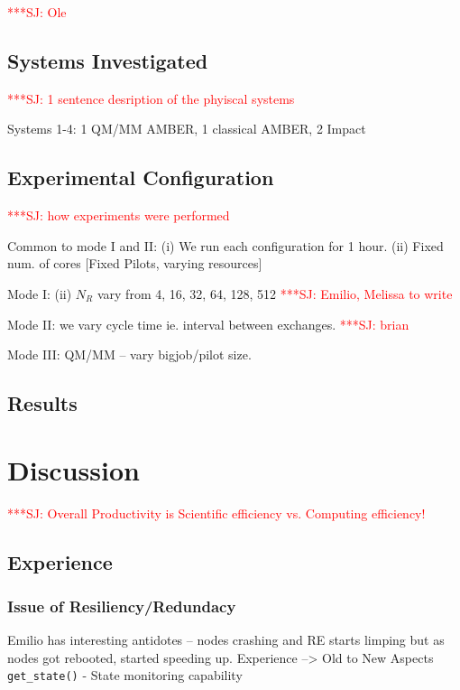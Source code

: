 \documentclass{sig-alternate}
\newcommand{\jhanote}[1]{ {\textcolor{red} { ***SJ: #1 }}}
\newcommand{\jhanote}[1]{}
\begin{document}
\jhanote{Ole}

\subsection{Systems Investigated} 

\jhanote{1 sentence desription of the phyiscal systems}

Systems 1-4: 1 QM/MM AMBER, 1 classical AMBER, 2 Impact

\subsection{Experimental Configuration}
\jhanote{how experiments were performed} 

Common to mode I and II: (i) We run each configuration for 1 hour.
(ii) Fixed num. of cores [Fixed Pilots, varying resources]

Mode I: (ii) $N_R$ vary from 4, 16, 32, 64, 128, 512 \jhanote{Emilio,
 Melissa to write}


Mode II:  we vary cycle time ie. interval between exchanges. \jhanote{brian}


Mode III: QM/MM -- vary bigjob/pilot size.


\subsection{Results}


\section{Discussion}

\jhanote{Overall Productivity is Scientific efficiency vs. Computing
  efficiency!}

\subsection{Experience}

\subsubsection{Issue of Resiliency/Redundacy} Emilio has interesting
antidotes -- nodes crashing and RE starts limping but as nodes got
rebooted, started speeding up.  Experience --> Old to New Aspects
\texttt{get\_state()} - State monitoring capability
\end{document}
